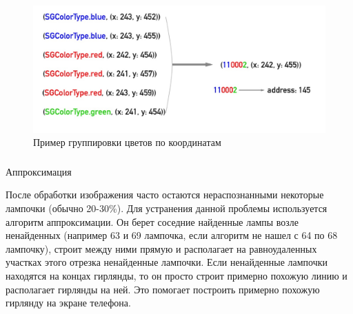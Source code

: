 ~
\begin{figure}[H]
\centering
	\includegraphics[scale=0.35]{figures/calibration_grouping.jpg}
	\caption{Пример группировки цветов по координатам}
	\label{fig:develop:algorithm:grouping}
\end{figure}

\subsubsection{} Аппроксимация
\label{sec:develop:algorithm:approximation}

После обработки изображения часто остаются нераспознанными некоторые лампочки (обычно 20-30\%). Для устранения данной проблемы используется алгоритм аппроксимации. Он берет соседние найденные лампы возле ненайденных (например 63 и 69 лампочка, если алгоритм не нашел с 64 по 68 лампочку), строит между ними прямую и располагает на равноудаленных участках этого отрезка ненайденные лампочки. Если ненайденные лампочки находятся на концах гирлянды, то он просто строит примерно похожую линию и располагает гирлянды на ней. Это помогает построить примерно похожую гирлянду на экране телефона.
